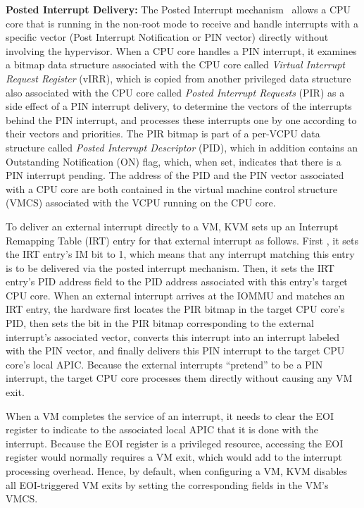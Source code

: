 {\bf Posted Interrupt Delivery:}
The Posted Interrupt mechanism~\cite{intelvtd-paper,intelvtd-manual} allows a CPU core that is running in the non-root mode to receive and handle interrupts with a specific vector
(Post Interrupt Notification or PIN vector) directly without involving the hypervisor.
When a CPU core handles a PIN interrupt, it examines a bitmap data structure associated with the CPU core called {\em Virtual Interrupt Request Register} (vIRR),
which is copied from another privileged data structure also associated with the CPU core called {\em Posted Interrupt Requests} (PIR) as a side effect of a PIN interrupt delivery,
to determine the vectors of the interrupts behind the PIN interrupt, and processes these interrupts one by one according to their vectors and priorities.
The PIR bitmap is part of a per-VCPU data structure called {\em Posted Interrupt Descriptor} (PID), which in addition contains an Outstanding Notification (ON) flag, which, when set, indicates that there is a PIN interrupt pending.
The address of the PID and the PIN vector associated with a CPU core are both contained in the virtual machine control structure (VMCS) associated with the VCPU running on the CPU core.


To deliver an external interrupt directly to a VM, KVM sets up an Interrupt Remapping Table (IRT) entry for that external interrupt as follows.
First , it sets the IRT entry's IM bit to 1, which means that any interrupt matching this entry is to be delivered via the posted interrupt mechanism.
Then, it sets the IRT entry's PID address field to the PID address associated with this entry's target CPU core.
When an external interrupt arrives at the IOMMU and matches an IRT entry, the
hardware first locates the PIR bitmap in the target CPU core's PID, then sets the bit in the PIR bitmap corresponding to the external interrupt's associated vector,
converts this interrupt into an interrupt labeled with the PIN vector, and finally delivers this PIN interrupt to the target CPU core's local APIC.
Because the external interrupts ``pretend'' to be a PIN interrupt, the target CPU core processes them directly without causing any VM exit.

When a VM completes the service of an interrupt, it needs to clear the EOI register to indicate to the
associated local APIC that it is done with the interrupt. Because the EOI register is a privileged resource, accessing the EOI register
would normally requires a VM exit, which would add to the interrupt processing overhead.
Hence, by default, when configuring a VM, KVM disables all EOI-triggered VM exits by setting the corresponding fields in the VM's VMCS.
